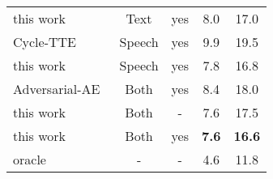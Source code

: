 \documentclass[a4paper]{article}
\begin{document}
\begin{table}[H]
{\begin{tabular}{lcccc}
{\footnotesize{}this work} & {\footnotesize{}Text} & {\footnotesize{}yes} & {\footnotesize{}8.0} & {\footnotesize{}17.0}\tabularnewline
{\footnotesize{}Cycle-TTE~\cite{hori2018cycle}} & {\footnotesize{}Speech} & {\footnotesize{}yes} & {\footnotesize{}9.9} & {\footnotesize{}19.5}\tabularnewline
{\footnotesize{}this work} & {\footnotesize{}Speech} & {\footnotesize{}yes} & {\footnotesize{}7.8} & {\footnotesize{}16.8}\tabularnewline
{\footnotesize{}Adversarial-AE~\cite{karita2018sequence}} & {\footnotesize{}Both} & {\footnotesize{}yes} & {\footnotesize{}8.4} & {\footnotesize{}18.0}\tabularnewline
{\footnotesize{}this work} & {\footnotesize{}Both} & - & {\footnotesize{}7.6} & {\footnotesize{}17.5}\tabularnewline
{\footnotesize{}this work} & {\footnotesize{}Both} & {\footnotesize{}yes} & {\footnotesize{}\textbf{7.6}} & {\footnotesize{}\textbf{16.6}}\tabularnewline
{\footnotesize{}oracle~\cite{hori2018cycle}} & - & - & {\footnotesize{}4.6} & {\footnotesize{}11.8}\tabularnewline
\hline
\end{tabular}}
\end{table}
\end{document}
